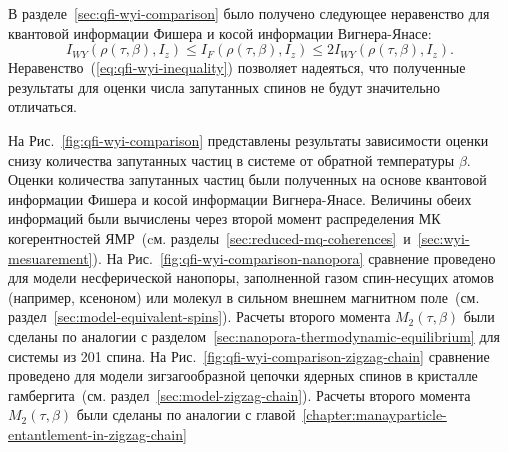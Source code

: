 В разделе~\ref{sec:qfi-wyi-comparison} было получено следующее неравенство
для квантовой информации Фишера и косой информации Вигнера-Янасе:
%
\begin{equation} \label{eq:qfi-wyi-inequality}
    I_{WY}\left(\rho(\tau,\beta), I_z\right)
    \leq I_F\left(\rho(\tau,\beta), I_z\right)
    \leq 2I_{WY}\left(\rho(\tau,\beta), I_z\right).
\end{equation}
%
Неравенство~(\ref{eq:qfi-wyi-inequality}) позволяет надеяться,
что полученные результаты для оценки числа запутанных спинов не будут значительно отличаться.

На Рис.~\ref{fig:qfi-wyi-comparison} представлены результаты зависимости
оценки снизу количества запутанных частиц в системе от обратной температуры $\beta$.
Оценки количества запутанных частиц были полученных на основе квантовой информации Фишера и косой информации Вигнера-Янасе.
Величины обеих информаций были вычислены через второй момент распределения МК когерентностей ЯМР~(cм.
разделы~\ref{sec:reduced-mq-coherences}~и~\ref{sec:wyi-mesuarement}).
На Рис.~\ref{fig:qfi-wyi-comparison-nanopora} сравнение проведено для модели несферической нанопоры,
заполненной газом спин-несущих атомов (например, ксеноном) или молекул в сильном внешнем магнитном поле~(см. раздел~\ref{sec:model-equivalent-spins}).
Расчеты второго момента $M_2(\tau, \beta)$ были сделаны по аналогии с разделом~\ref{sec:nanopora-thermodynamic-equilibrium} для системы из 201 спина.
На Рис.~\ref{fig:qfi-wyi-comparison-zigzag-chain} сравнение проведено
для модели зигзагообразной цепочки ядерных спинов в кристалле гамбергита~(см. раздел~\ref{sec:model-zigzag-chain}).
Расчеты второго момента $M_2(\tau, \beta)$ были сделаны по аналогии с главой~\ref{chapter:manayparticle-entantlement-in-zigzag-chain}


